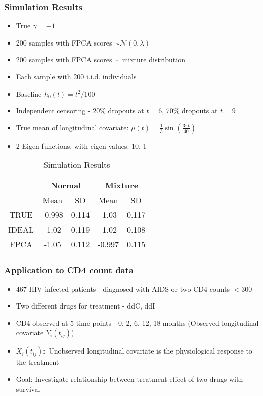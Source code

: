 \documentclass[10pt,dvipsnames,table, handout]{beamer} %
\begin{document}
\begin{frame}
\frametitle{Simulation Results}
\begin{itemize}
\item True $\gamma = -1$
\item 200 samples with FPCA scores $\sim \mathcal{N}(0, \lambda)$
\item 200 samples with FPCA scores $\sim$ mixture distribution\item Each sample with 200 i.i.d. individuals
\item Baseline $h_0(t) = t^2/100 $
\item Independent censoring - 20\% dropouts at $t=6$, 70\% dropouts at $t=9$
\item True mean of longitudinal covariate: $\mu(t) = \frac{1}{3}\sin\left(\frac{3 \pi t}{40} \right)$
\item 2 Eigen functions, with eigen values: 10, 1
\end{itemize}
\begin{table}[H]
\centering
\begin{tabular}{c|c|c|c|c}
\hline
& \multicolumn{2}{|c|}{Normal} & \multicolumn{2}{|c}{Mixture} \\ 
\hline
& Mean & SD & Mean & SD \\
\hline
TRUE & -0.998 & 0.114 & -1.03 & 0.117\\
\hline
IDEAL & -1.02 & 0.119 & -1.02 & 0.108\\
\hline
\rowcolor{gray}
FPCA & -1.05 & 0.112 & -0.997 & 0.115\\
\hline
\end{tabular}
\caption{Simulation Results}
\end{table}

\end{frame}

\begin{frame}
\frametitle{Application to CD4 count data}
\begin{itemize}
\item 467 HIV-infected patients - diagnosed with AIDS or two CD4 counts $< 300$
\item Two different drugs for treatment - ddC, ddI
\item CD4 observed at 5 time points - 0, 2, 6, 12, 18 months (Observed longitudinal covariate $Y_{i}(t_{ij})$)
\item $X_{i}(t_{ij}): $ Unobserved longitudinal covariate is the physiological response to the treatment
\item Goal: Investigate relationship between treatment effect of two drugs with survival
\end{itemize}

\end{frame}
\end{document}
